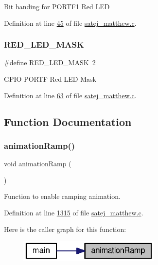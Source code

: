 Bit banding for P\+O\+R\+T\+F1 Red L\+ED 

Definition at line \mbox{\hyperlink{satej__matthew_8c_source_l00045}{45}} of file \mbox{\hyperlink{satej__matthew_8c_source}{satej\+\_\+matthew.\+c}}.

\mbox{\label{satej__matthew_8c_a2de27af622c55526783a345c21cec42e}} 
\subsubsection{\texorpdfstring{RED\_LED\_MASK}{RED\_LED\_MASK}}
{\footnotesize\ttfamily \#define R\+E\+D\+\_\+\+L\+E\+D\+\_\+\+M\+A\+SK~2}

G\+P\+IO P\+O\+R\+TF Red L\+ED Mask 

Definition at line \mbox{\hyperlink{satej__matthew_8c_source_l00063}{63}} of file \mbox{\hyperlink{satej__matthew_8c_source}{satej\+\_\+matthew.\+c}}.



\subsection{Function Documentation}
\mbox{\label{satej__matthew_8c_ae9ae5be10d7512aa7f78c8cc37cd8bb8}} 
\subsubsection{\texorpdfstring{animationRamp()}{animationRamp()}}
{\footnotesize\ttfamily void animation\+Ramp (\begin{DoxyParamCaption}{ }\end{DoxyParamCaption})}



Function to enable ramping animation. 



Definition at line \mbox{\hyperlink{satej__matthew_8c_source_l01315}{1315}} of file \mbox{\hyperlink{satej__matthew_8c_source}{satej\+\_\+matthew.\+c}}.

Here is the caller graph for this function\+:
\nopagebreak
\begin{figure}[H]
\begin{center}
\leavevmode
\includegraphics[width=202pt]{satej__matthew_8c_ae9ae5be10d7512aa7f78c8cc37cd8bb8_icgraph}
\end{center}
\end{figure}
\mbox{\label{satej__matthew_8c_ae0e2b59e29ecdbadeb6bfa1a9efa5a85}} 
